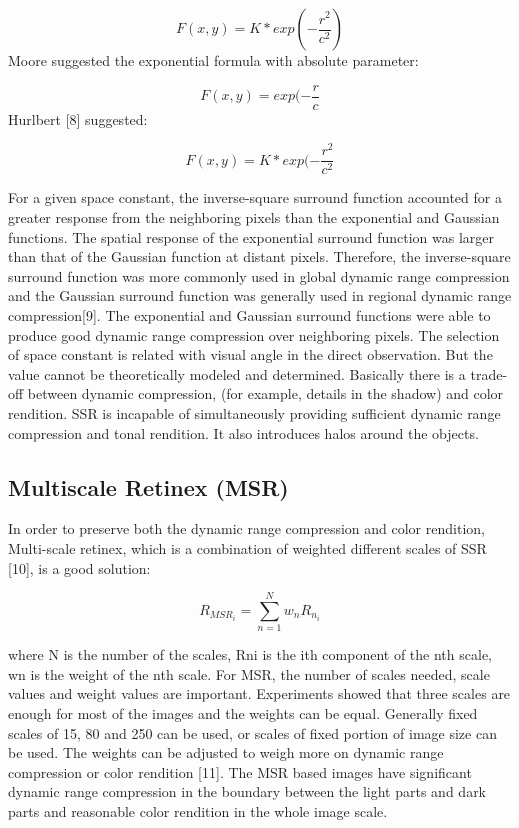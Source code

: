 \begin{equation}
	F(x,y)=K*exp(-\frac{r^2}{c^2})
\end{equation}
Moore suggested the exponential formula with absolute
parameter:

\begin{equation}
	F(x,y)=exp(-\frac{r}{c}
\end{equation}
Hurlbert [8] suggested:

\begin{equation}
	F(x,y)=K*exp(-\frac{r^2}{c^2}
\end{equation}

For a given space constant, the inverse-square surround
function accounted for a greater response from the
neighboring pixels than the exponential and Gaussian
functions. The spatial response of the exponential
surround function was larger than that of the Gaussian
function at distant pixels. Therefore, the inverse-square
surround function was more commonly used in global
dynamic range compression and the Gaussian surround
function was generally used in regional dynamic range
compression[9]. The exponential and Gaussian surround
functions were able to produce good dynamic range
compression over neighboring pixels. The selection of
space constant is related with visual angle in the direct
observation. But the value cannot be theoretically
modeled and determined. Basically there is a trade-off
between dynamic compression, (for example, details in
the shadow) and color rendition.
SSR is incapable of simultaneously providing sufficient
dynamic range compression and tonal rendition. It also
introduces halos around the objects.

\subsection{Multiscale Retinex (MSR)}
In order to preserve both the dynamic range compression
and color rendition, Multi-scale retinex, which is a
combination of weighted different scales of SSR [10], is
a good solution:

\begin{equation}
	R_{MSR_{i}}=\sum_{n=1}^{N}w_{n}R_{n_{i}}
\end{equation}

where N is the number of the scales, Rni is the ith
component of the nth scale, wn is the weight of the nth
scale. For MSR, the number of scales needed, scale
values and weight values are important. Experiments
showed that three scales are enough for most of the
images and the weights can be equal. Generally fixed
scales of 15, 80 and 250 can be used, or scales of fixed
portion of image size can be used. The weights can be
adjusted to weigh more on dynamic range compression
or color rendition [11]. The MSR based images have
significant dynamic range compression in the boundary
between the light parts and dark parts and reasonable
color rendition in the whole image scale.

